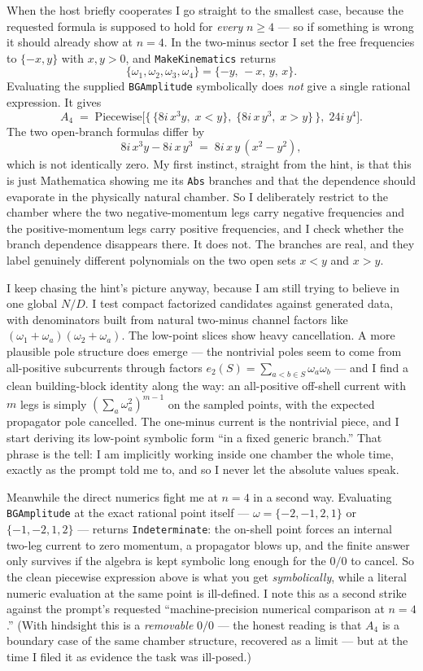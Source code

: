 \documentclass{article}
\begin{document}
When the host briefly cooperates I go straight to the smallest case, because
the requested formula is supposed to hold for \emph{every} $n\ge4$ --- so if
something is wrong it should already show at $n=4$. In the two-minus sector I
set the free frequencies to $\{-x,y\}$ with $x,y>0$, and \texttt{MakeKinematics}
returns
\[
\{\omega_1,\omega_2,\omega_3,\omega_4\}=\{-y,\,-x,\,y,\,x\}.
\]
Evaluating the supplied \texttt{BGAmplitude} symbolically does \emph{not} give
a single rational expression. It gives
\[
A_4 \;=\; \mathrm{Piecewise}\Big[\{\,\{8i\,x^3y,\;x<y\},\;\{8i\,x\,y^3,\;x>y\}\,\},\;24i\,y^4\Big].
\]
The two open-branch formulas differ by
\[
8i\,x^3y-8i\,x\,y^3 \;=\; 8i\,x\,y\,(x^2-y^2),
\]
which is not identically zero. My first instinct, straight from the hint, is
that this is just Mathematica showing me its \texttt{Abs} branches and that the
dependence should evaporate in the physically natural chamber. So I
deliberately restrict to the chamber where the two negative-momentum legs carry
negative frequencies and the positive-momentum legs carry positive
frequencies, and I check whether the branch dependence disappears there. It
does not. The branches are real, and they label genuinely different polynomials
on the two open sets $x<y$ and $x>y$.

I keep chasing the hint's picture anyway, because I am still trying to believe
in one global $N/D$. I test compact factorized candidates against generated
data, with denominators built from natural two-minus channel factors like
$(\omega_1+\omega_a)(\omega_2+\omega_a)$. The low-point slices show heavy
cancellation. A more plausible pole structure does emerge --- the nontrivial
poles seem to come from all-positive subcurrents through factors
$e_2(S)=\sum_{a<b\in S}\omega_a\omega_b$ --- and I find a clean building-block
identity along the way: an all-positive off-shell current with $m$ legs is
simply $(\sum_a\omega_a^2)^{m-1}$ on the sampled points, with the expected
propagator pole cancelled. The one-minus current is the nontrivial piece, and
I start deriving its low-point symbolic form ``in a fixed generic branch.''
That phrase is the tell: I am implicitly working inside one chamber the whole
time, exactly as the prompt told me to, and so I never let the absolute values
speak.

Meanwhile the direct numerics fight me at $n=4$ in a second way. Evaluating
\texttt{BGAmplitude} at the exact rational point itself --- $\omega=\{-2,-1,2,1\}$
or $\{-1,-2,1,2\}$ --- returns \texttt{Indeterminate}: the on-shell point forces
an internal two-leg current to zero momentum, a propagator blows up, and the
finite answer only survives if the algebra is kept symbolic long enough for the
$0/0$ to cancel. So the clean piecewise expression above is what you get
\emph{symbolically}, while a literal numeric evaluation at the same point is
ill-defined. I note this as a second strike against the prompt's requested
``machine-precision numerical comparison at $n=4$.'' (With hindsight this is a
\emph{removable} $0/0$ --- the honest reading is that $A_4$ is a boundary case
of the same chamber structure, recovered as a limit --- but at the time I
filed it as evidence the task was ill-posed.)
\end{document}
